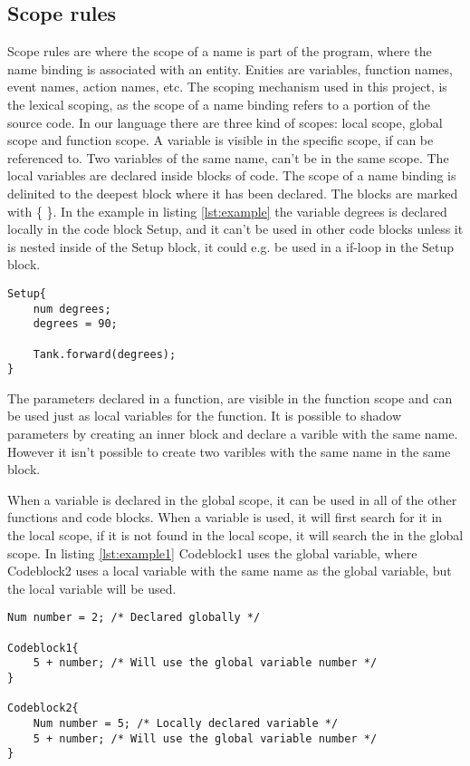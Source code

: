 \subsection{Scope rules}
Scope rules are where the scope of a name is part of the program, where the name binding is associated with an entity. Enities are variables, function names, event names, action names, etc. The scoping mechanism used in this project, is the lexical scoping, as the scope of a name binding refers to a portion of the source code. In our language there are three kind of scopes: local scope, global scope and function scope. A variable is visible in the specific scope, if can be referenced to. Two variables of the same name, can't be in the same scope. The local variables are declared inside blocks of code. The scope of a name binding is delinited to the deepest block where it has been declared. The blocks are marked with \{ \}. In the example in listing \ref{lst:example} the variable degrees is declared locally in the code block Setup, and it can't be used in other code blocks unless it is nested inside of the Setup block, it could e.g. be used in a if-loop in the Setup block. 

\begin{lstlisting}[caption={Example of local scoping rules},  xleftmargin=.2\textwidth, label={lst:example}]
Setup{
	num degrees;
	degrees = 90;
	
	Tank.forward(degrees);
}
\end{lstlisting}

The parameters declared in a function, are visible in the function scope and can be used just as local variables for the function. It is possible to shadow parameters by creating an inner block and declare a varible with the same name. However it isn't possible to create two varibles with the same name in the same block. 

When a variable is declared in the global scope, it can be used in all of the other functions and code blocks. When a variable is used, it will first search for it in the local scope, if it is not found in the local scope, it will search the in the global scope. In listing \ref{lst:example1} Codeblock1 uses the global variable, where Codeblock2 uses a local variable with the same name as the global variable, but the local variable will be used.


\begin{lstlisting}[caption={Example of global scoping rules},  xleftmargin=.2\textwidth, label={lst:example1}]
Num number = 2; /* Declared globally */

Codeblock1{
	5 + number; /* Will use the global variable number */
}

Codeblock2{
	Num number = 5; /* Locally declared variable */
	5 + number; /* Will use the global variable number */
}
\end{lstlisting}
